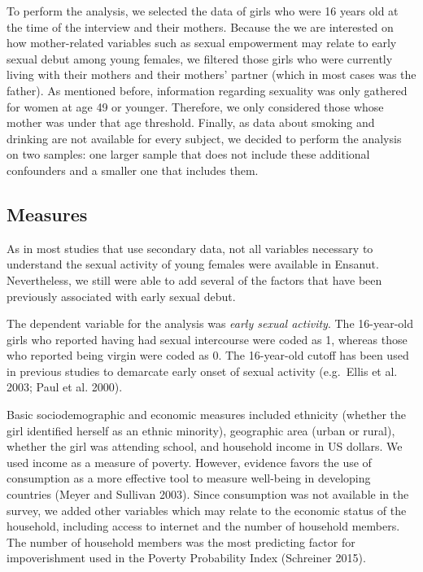 \documentclass[
]{article}
\begin{document}
To perform the analysis, we selected the data of girls who were 16 years
old at the time of the interview and their mothers. Because the we are
interested on how mother-related variables such as sexual empowerment
may relate to early sexual debut among young females, we filtered those
girls who were currently living with their mothers and their mothers'
partner (which in most cases was the father). As mentioned before,
information regarding sexuality was only gathered for women at age 49 or
younger. Therefore, we only considered those whose mother was under that
age threshold. Finally, as data about smoking and drinking are not
available for every subject, we decided to perform the analysis on two
samples: one larger sample that does not include these additional
confounders and a smaller one that includes them.

\hypertarget{measures}{%
\subsection{Measures}\label{measures}}

As in most studies that use secondary data, not all variables necessary
to understand the sexual activity of young females were available in
Ensanut. Nevertheless, we still were able to add several of the factors
that have been previously associated with early sexual debut.

The dependent variable for the analysis was \emph{early sexual
activity}. The 16-year-old girls who reported having had sexual
intercourse were coded as 1, whereas those who reported being virgin
were coded as 0. The 16-year-old cutoff has been used in previous
studies to demarcate early onset of sexual activity (e.g.~Ellis et al.
2003; Paul et al. 2000).

Basic sociodemographic and economic measures included ethnicity (whether
the girl identified herself as an ethnic minority), geographic area
(urban or rural), whether the girl was attending school, and household
income in US dollars. We used income as a measure of poverty. However,
evidence favors the use of consumption as a more effective tool to
measure well-being in developing countries (Meyer and Sullivan 2003).
Since consumption was not available in the survey, we added other
variables which may relate to the economic status of the household,
including access to internet and the number of household members. The
number of household members was the most predicting factor for
impoverishment used in the Poverty Probability Index (Schreiner 2015).
\end{document}
